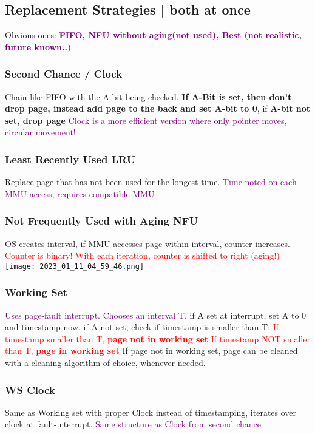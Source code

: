 \documentclass[main.tex,fontsize=8pt,paper=a4,paper=landscape,DIV=calc,]{scrartcl}
\begin{document}
\begin{multicols*}{4}
\subsection{Replacement Strategies | both at once}
Obvious ones: \textbf{\textcolor{purple}{FIFO, NFU without aging(not used), Best (not realistic, future known..)}}
\subsubsection{Second Chance / Clock}
Chain like FIFO with the A-bit being checked.\newline
\textbf{If A-Bit is set, then don't drop page, instead add page to the back and set A-bit to 0}, if \textbf{A-bit not set, drop page}\newline
\textcolor{purple}{Clock is a more efficient version where only pointer moves, circular movement!}\newline

\subsubsection{Least Recently Used LRU}
Replace page that has not been used for the longest time.\newline
\textcolor{purple}{Time noted on each MMU access, requires compatible MMU}

\subsubsection{Not Frequently Used with Aging NFU}
OS creates interval, if MMU accesses page within interval, counter increases.\newline
\textcolor{red}{Counter is binary! With each iteration, counter is shifted to right (aging!)}\newline
\texttt{[image: 2023\_01\_11\_04\_59\_46.png]}

\subsubsection{Working Set}
\textcolor{purple}{Uses page-fault interrupt. Chooses an interval T.}\newline
if A set at interrupt, set A to 0 and timestamp now.\newline
if A not set, check if timestamp is smaller than T:\newline
\textcolor{red}{If timestamp smaller than T, \textbf{page not in working set}}\newline
\textcolor{red}{If timestamp NOT smaller than T, \textbf{page in working set}}\newline
If page not in working set, page can be cleaned with a cleaning algorithm of choice, whenever needed.

\subsubsection{WS Clock}
Same as Working set with proper Clock instead of timestamping, iterates over clock at fault-interrupt.\newline
\textcolor{purple}{Same structure as Clock from second chance}

\end{multicols*}
\end{document}
